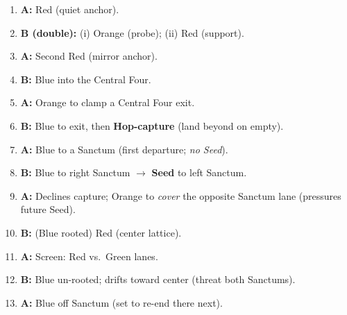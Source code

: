 \begin{multicols}{2}
\begin{enumerate}[leftmargin=*,itemsep=0.35em,label=\textbf{M\arabic*:}]

\item \textbf{A:} Red  (quiet anchor). 

\item \textbf{B (double):} (i) Orange  (probe);\; (ii) Red  (support). 

\item \textbf{A:} Second Red  (mirror anchor). 

\item \textbf{B:} Blue  into the Central Four.  

\item \textbf{A:} Orange  to clamp a Central Four exit. 

\item \textbf{B:} Blue  to exit, then \textbf{Hop-capture} (land beyond on empty). \;  

\item \textbf{A:} Blue  to a Sanctum (first departure; \emph{no Seed}). 

\item \textbf{B:} Blue to right Sanctum $\to$ \textbf{Seed} to left Sanctum. \RoC\; 

\item \textbf{A:} Declines capture; Orange  to \emph{cover} the opposite Sanctum lane (pressures future Seed). 

\item \textbf{B:} (Blue rooted) Red  (center lattice). 

\item \textbf{A:} Screen: Red  vs.\ Green lanes. 

\item \textbf{B:} Blue un-rooted; drifts  toward center (threat both Sanctums).

\item \textbf{A:} Blue  off Sanctum (set to re-end there next). 


\end{enumerate}
\end{multicols}

